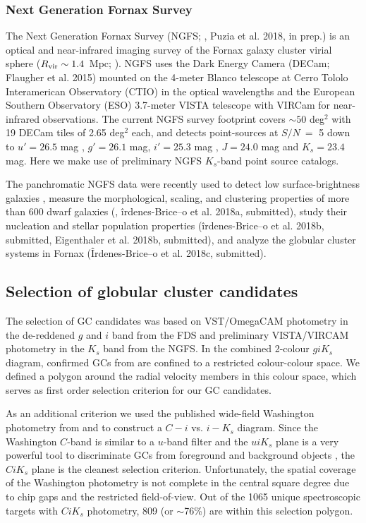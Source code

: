 \documentclass[usenatbib]{mnras}
\begin{document}
\subsubsection{Next Generation Fornax Survey}
\label{sec:NGFS}
The Next Generation Fornax Survey (NGFS; \citealt{munoz15}, Puzia et al. 2018, in prep.)
is an optical and near-infrared imaging survey of the Fornax
galaxy cluster virial sphere ($R_{\rm vir}\sim 1.4$~Mpc; \citealt{Drinkwater+01}).
NGFS uses the Dark Energy Camera (DECam; Flaugher et al. 2015) mounted on the
4-meter Blanco telescope at Cerro Tololo Interamerican Observatory (CTIO) in the
optical wavelengths and the European Southern Observatory (ESO) 3.7-meter VISTA
telescope with VIRCam \citep{sutherland15} for near-infrared observations.
The current NGFS survey footprint covers $\sim50$ deg$^2$ with 19 DECam tiles of 2.65
deg$^2$ each, and detects point-sources at $S/N\ =$ 5 down to $u'= 26.5$ mag , $g'= 26.1$ mag,
$i'= 25.3$ mag , $J = 24.0$ mag and $K_s = 23.4$ mag. Here we make use of preliminary NGFS
$K_s$-band point source catalogs.

The panchromatic NGFS data were recently used to detect low surface-brightness
galaxies \citep{munoz15}, measure the morphological, scaling, and clustering
properties of more than 600 dwarf galaxies (\citealt{Eigenthaler18}, îrdenes-Brice–o
et al. 2018a, submitted), study their nucleation and stellar population properties
(îrdenes-Brice–o et al. 2018b, submitted, Eigenthaler et al. 2018b, submitted),
and analyze the globular cluster systems in Fornax ({\^I}rdenes-Brice–o et al. 2018c, submitted).

\subsection{Selection of globular cluster candidates}
\label{sec:selectionGC}
The selection of GC candidates was based on VST/OmegaCAM photometry in the de-reddened $g$
and $i$ band from the FDS \citep{DAbrusco16,Iodice16} and preliminary
VISTA/VIRCAM photometry in the $K_s$ band from the NGFS.
In the combined 2-colour $g i K_s$ diagram, confirmed GCs from \citet{Schuberth}
are confined to a restricted colour-colour space. We defined a polygon around
the radial velocity members in this colour space, which serves as first order
selection criterion for our GC candidates.

As an additional criterion we used the published wide-field Washington
photometry from \citet{Dirsch04} and \citet{Bassino} to construct a $C-i$ vs.
$i-K_s$ diagram. Since the Washington $C$-band is similar to a $u$-band filter
and the $uiK_s$ plane is a very powerful tool to discriminate GCs from
foreground and background objects \citep{Munoz14}, the $CiK_s$ plane is the
cleanest selection criterion. Unfortunately, the spatial coverage of the
Washington photometry is not complete in the central square degree due to chip
gaps and the restricted field-of-view. Out of the 1065 unique spectroscopic
targets with $CiK_s$ photometry, 809 (or $\sim$76\%) are within this selection
polygon.
\end{document}
